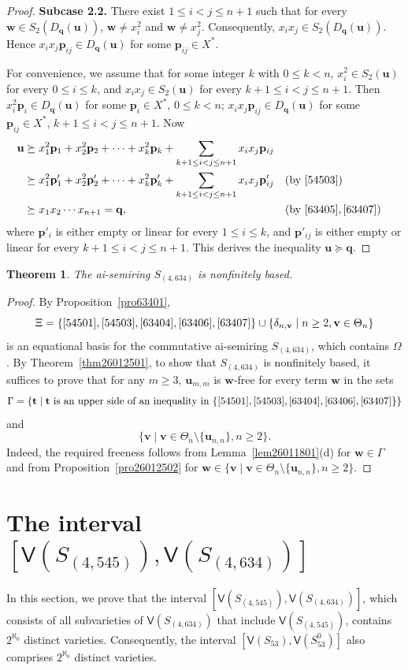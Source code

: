 \documentclass[reqno]{amsart}
\theoremstyle{plain}
\newtheorem{thm}{Theorem}[section]
\theoremstyle{definition}
\newcommand{\bp}{\mathbf{p}}
\newcommand{\bq}{\mathbf{q}}
\newcommand{\bt}{\mathbf{t}}
\newcommand{\bu}{\mathbf{u}}
\newcommand{\bv}{\mathbf{v}}
\newcommand{\bw}{\mathbf{w}}
\begin{document}
\begin{proof}
\textbf{Subcase 2.2.} There exist $1\leq i<j\leq n+1$ such that
for every $\bw\in S_2(D_\bq(\bu))$, $\bw\neq x_{i}^2$ and $\bw\neq x_{j}^2$.
Consequently, $x_{i}x_{j} \in S_2(D_\bq(\bu))$.
Hence $x_{i}x_{j}\bp_{ij}\in D_\bq(\bu)$ for some $\bp_{ij}\in X^*$.

For convenience, we assume that for some integer $k$ with $0\leq k<n$,
$x_i^2\in S_2(\bu)$ for every $0\leq i\leq k$, and $x_ix_j\in S_2(\bu)$ for every $k+1\leq i<j\leq n+1$.
Then $x_i^2\bp_i\in D_\bq(\bu)$ for some $\bp_i\in X^*$, $0\leq k<n$;
$x_ix_j\bp_{ij}\in D_\bq(\bu)$ for some $\bp_{ij}\in X^*$, $k+1\leq i<j\leq n+1$.
Now
\begin{align*}
\bu
&\succeq x_1^2\bp_1+x_2^2\bp_2+\dots+x_k^2\bp_k+\sum_{k+1\leq i<j\leq n+1}x_ix_j\bp_{ij}\\
&\succeq x_1^2\bp'_1+x_2^2\bp'_2+\dots+x_k^2\bp'_k+\sum_{k+1\leq i<j\leq n+1}x_ix_j\bp'_{ij} &&(\text{by}~\eqref{54503})\\
&\succeq x_1x_2\cdots x_{n+1}=\bq, &&(\text{by}~\eqref{63405}, \eqref{63407})
\end{align*}
where $\bp'_i$ is either empty or linear for every $1\leq i \leq k$,
and $\bp'_{ij}$ is either empty or linear for every $k+1\leq i<j\leq n+1$.
This derives the inequality $\bu \succeq \bq$.
\end{proof}


\begin{thm}
The ai-semiring $S_{(4, 634)}$ is nonfinitely based.
\end{thm}
\begin{proof}
By Proposition~\ref{pro63401},
\[
\Xi=\{\eqref{54501}, \eqref{54503}, \eqref{63404}, \eqref{63406}, \eqref{63407}\}
\cup\{\delta_{n, \bv} \mid n\geq 2, \bv\in \Theta_n\}
\]
is an equational basis for the commutative ai-semiring $S_{(4, 634)}$, which contains $\Omega$.
By Theorem~\ref{thm26012501}, to show that $S_{(4, 634)}$ is nonfinitely based,
it suffices to prove that for any $m\geq 3$, $\bu_{m, m}$ is $\bw$-free for every term $\bw$ in the sets
\[
\Gamma=\{\bt \mid \bt ~\text{is an upper side of an inequality in}~\{\eqref{54501}, \eqref{54503},\eqref{63404},\eqref{63406},\eqref{63407}\}\}
\]
and
\[
\{\bv \mid \bv\in \Theta_n\setminus \{\bu_{n,n}\}, n\geq 2\}.
\]
Indeed, the required freeness follows from Lemma~\ref{lem26011801}(d) for $\mathbf{w} \in\Gamma$
and from Proposition~\ref{pro26012502} for $\mathbf{w}\in \{\bv \mid \bv\in \Theta_n\setminus  \{\bu_{n,n}\}, n\geq 2\}$.
\end{proof}

\section{The interval $[\mathsf{V}(S_{(4, 545)}), \mathsf{V}(S_{(4, 634)})]$}
In this section, we prove that the interval
$[\mathsf{V}(S_{(4, 545)}), \mathsf{V}(S_{(4, 634)})]$,
which consists of all subvarieties of $\mathsf{V}(S_{(4, 634)})$ that include $\mathsf{V}(S_{(4, 545)})$,
contains $2^{\aleph_0}$ distinct varieties.
Consequently, the interval $[\mathsf{V}(S_{53}), \mathsf{V}(S_{53}^0)]$ also comprises $2^{\aleph_0}$ distinct varieties.
\end{document}
